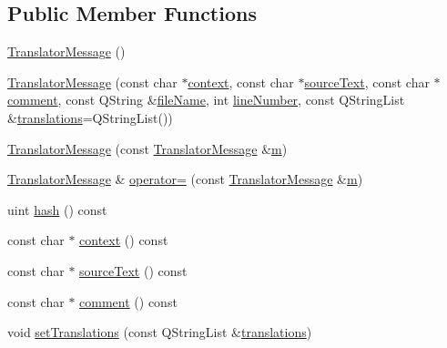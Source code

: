 \subsection*{Public Member Functions}
\begin{DoxyCompactItemize}
\item 
\hyperlink{classTranslatorMessage_a15601e53edec8b819fb0b7dc2b8e2fa8}{Translator\+Message} ()
\item 
\hyperlink{classTranslatorMessage_a771a0a6879105886a9c584f87e6d4fc5}{Translator\+Message} (const char $\ast$\hyperlink{classTranslatorMessage_a6458de49df3e922836b7ca119da62381}{context}, const char $\ast$\hyperlink{classTranslatorMessage_adc41c2ef47b12966ac00d3bcc7d6a6e9}{source\+Text}, const char $\ast$\hyperlink{classTranslatorMessage_afacd6b0ed6fddab4e5c686a6577c50a4}{comment}, const Q\+String \&\hyperlink{classTranslatorMessage_a215130997a8e69215669c319162de60d}{file\+Name}, int \hyperlink{classTranslatorMessage_a321cbc7d11b8d11cbe6d51df73a564b7}{line\+Number}, const Q\+String\+List \&\hyperlink{classTranslatorMessage_ad302db7bc501402af00ae6dedcfead88}{translations}=Q\+String\+List())
\item 
\hyperlink{classTranslatorMessage_a480f188e07287ad7e765584681503848}{Translator\+Message} (const \hyperlink{classTranslatorMessage}{Translator\+Message} \&\hyperlink{indexexpr_8h_ab72fdb4031d47b75ab26dd18a437bcdc}{m})
\item 
\hyperlink{classTranslatorMessage}{Translator\+Message} \& \hyperlink{classTranslatorMessage_a24327eff907c719a3c849551cc514a96}{operator=} (const \hyperlink{classTranslatorMessage}{Translator\+Message} \&\hyperlink{indexexpr_8h_ab72fdb4031d47b75ab26dd18a437bcdc}{m})
\item 
uint \hyperlink{classTranslatorMessage_a16d5f7a1cdbbf137d9b6eb081faf406a}{hash} () const 
\item 
const char $\ast$ \hyperlink{classTranslatorMessage_a6458de49df3e922836b7ca119da62381}{context} () const 
\item 
const char $\ast$ \hyperlink{classTranslatorMessage_adc41c2ef47b12966ac00d3bcc7d6a6e9}{source\+Text} () const 
\item 
const char $\ast$ \hyperlink{classTranslatorMessage_afacd6b0ed6fddab4e5c686a6577c50a4}{comment} () const 
\item 
void \hyperlink{classTranslatorMessage_a04d0f0d154eea322c2bfde257f2989fd}{set\+Translations} (const Q\+String\+List \&\hyperlink{classTranslatorMessage_ad302db7bc501402af00ae6dedcfead88}{translations})
\item 

\end{DoxyCompactItemize}
